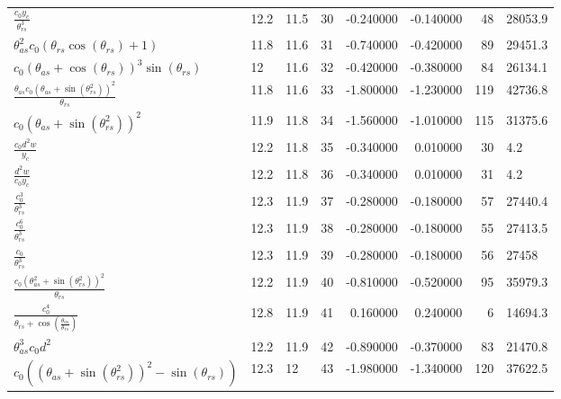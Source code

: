 \begin{tabularx}{\textwidth}{lllrrrrl}
$ \displaystyle\frac{c_{0} y_c}{\theta_{rs}^{3}} $  &  12.2  &  11.5  &  30  &  -0.240000  &  -0.140000  &  48  &  28053.9  \\ 
$ \theta_{as}^{2} c_{0} \left(\theta_{rs} \cos{\left(\theta_{rs} \right)} + 1\right) $  &  11.8  &  11.6  &  31  &  -0.740000  &  -0.420000  &  89  &  29451.3  \\ 
$ c_{0} \left(\theta_{as} + \cos{\left(\theta_{rs} \right)}\right)^{3} \sin{\left(\theta_{rs} \right)} $  &  12\phantom{.0}  &  11.6  &  32  &  -0.420000  &  -0.380000  &  84  &  26134.1  \\ 
$ \displaystyle\frac{\theta_{as} c_{0} \left(\theta_{as} + \sin{\left(\theta_{rs}^{2} \right)}\right)^{2}}{\theta_{rs}} $  &  11.8  &  11.6  &  33  &  -1.800000  &  -1.230000  &  119  &  42736.8  \\ 
$ c_{0} \left(\theta_{as} + \sin{\left(\theta_{rs}^{2} \right)}\right)^{2} $  &  11.9  &  11.8  &  34  &  -1.560000  &  -1.010000  &  115  &  31375.6  \\ 
$ \displaystyle\frac{c_{0} d^{2} w}{y_c} $  &  12.2  &  11.8  &  35  &  -0.340000  &  0.010000  &  30  &  4.2  \\ 
$ \displaystyle\frac{d^{2} w}{c_{0} y_c} $  &  12.2  &  11.8  &  36  &  -0.340000  &  0.010000  &  31  &  4.2  \\ 
$ \displaystyle\frac{c_{0}^{3}}{\theta_{rs}^{3}} $  &  12.3  &  11.9  &  37  &  -0.280000  &  -0.180000  &  57  &  27440.4  \\ 
$ \displaystyle\frac{c_{0}^{6}}{\theta_{rs}^{3}} $  &  12.3  &  11.9  &  38  &  -0.280000  &  -0.180000  &  55  &  27413.5  \\ 
$ \displaystyle\frac{c_{0}}{\theta_{rs}^{3}} $  &  12.3  &  11.9  &  39  &  -0.280000  &  -0.180000  &  56  &  27458\phantom{.0}  \\ 
$ \displaystyle\frac{c_{0} \left(\theta_{as}^{2} + \sin{\left(\theta_{rs}^{2} \right)}\right)^{2}}{\theta_{rs}} $  &  12.2  &  11.9  &  40  &  -0.810000  &  -0.520000  &  95  &  35979.3  \\ 
$ \displaystyle\frac{c_{0}^{4}}{\theta_{rs} + \cos{\left(\displaystyle\frac{\theta_{as}}{\theta_{rs}} \right)}} $  &  12.8  &  11.9  &  41  &  0.160000  &  0.240000  &  6  &  14694.3  \\ 
$ \theta_{as}^{3} c_{0} d^{2} $  &  12.2  &  11.9  &  42  &  -0.890000  &  -0.370000  &  83  &  21470.8  \\ 
$ c_{0} \left(\left(\theta_{as} + \sin{\left(\theta_{rs}^{2} \right)}\right)^{2} - \sin{\left(\theta_{rs} \right)}\right) $  &  12.3  &  12\phantom{.0}  &  43  &  -1.980000  &  -1.340000  &  120  &  37622.5  \\ 

\end{tabularx}
